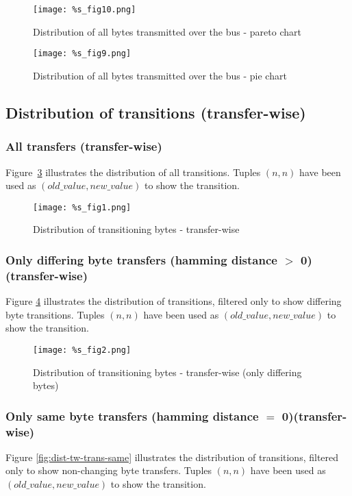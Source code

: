 \documentclass[a4paper,12pt]{article}
\begin{document}
{{{{{{{{{{{{{{{{{{\begin{figure}[H]
		\centering
		\texttt{[image: \%s\_fig10.png]}
		\caption{Distribution of all bytes transmitted over the bus - pareto chart}
		\label{fig:dist-byte-pareto}
\end{figure}	

\begin{figure}[H]
		\centering
		\texttt{[image: \%s\_fig9.png]}
		\caption{Distribution of all bytes transmitted over the bus - pie chart}
		\label{fig:dist-byte-pie}
\end{figure}	

\pagebreak
\subsection{Distribution of transitions (transfer-wise)}
\subsubsection{All transfers (transfer-wise)}
Figure~\ref{fig:dist-tw-trans} illustrates the distribution of 
all transitions. Tuples $(n,n)$ 
have been used as $(old\_value, new\_value)$ to show the transition.

\begin{figure}[H]
		\centering
		\texttt{[image: \%s\_fig1.png]}
		\caption{Distribution of transitioning bytes - transfer-wise}
		\label{fig:dist-tw-trans}
\end{figure}	

\pagebreak
\subsubsection{Only differing byte transfers (hamming distance $>$ 0)(transfer-wise)}
Figure \ref{fig:dist-tw-trans-diff} illustrates the distribution of 
transitions, filtered only to show differing byte transitions. Tuples $(n,n)$ 
have been used as $(old\_value, new\_value)$ to show the transition.

\begin{figure}[H]
		\centering
		\texttt{[image: \%s\_fig2.png]}
		\caption{Distribution of transitioning bytes - 
                  transfer-wise (only differing bytes)}
		\label{fig:dist-tw-trans-diff}
\end{figure}	

\pagebreak
\subsubsection{Only same byte transfers (hamming distance $=$ 0)(transfer-wise)}
Figure \ref{fig:dist-tw-trans-same} illustrates the distribution of
transitions, filtered only to show non-changing byte transfers. Tuples $(n,n)$ 
have been used as $(old\_value, new\_value)$ to show the transition.

}}}}}}}}}}}}}}}}}}
\end{document}
